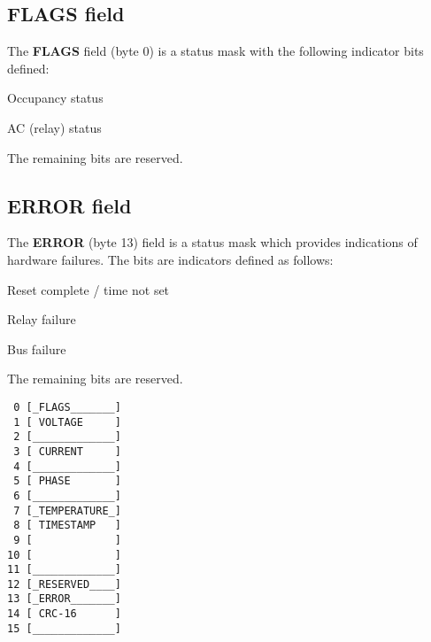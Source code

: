 \documentclass[11pt]{article}
\begin{document}
\vspace{12pt}
\noindent
\begin{minipage}{.5\textwidth}
\subsection{FLAGS field}
The \textbf{FLAGS} field (byte 0) is a status mask with the following indicator bits defined:
\begin{description}
	\itemsep 0pt
	\item[0x01] Occupancy status
	\item[0x02] AC (relay) status 
\end{description}
The remaining bits are reserved.

\subsection{ERROR field}
\label{subsec:errorfield}
The \textbf{ERROR} (byte 13) field is a status mask which provides indications of hardware failures. The bits are indicators defined as follows:
\begin{description}
	\itemsep 0pt
	\item[0x80] Reset complete / time not set
	\item[0x40] Relay failure
	\item[0x20] Bus failure
\end{description}
The remaining bits are reserved. 
\end{minipage}
\hspace{24pt}
\begin{minipage}{.25\textwidth}
\vspace{12pt}
\begin{verbatim}
 0 [_FLAGS_______]
 1 [ VOLTAGE     ]
 2 [_____________]
 3 [ CURRENT     ]
 4 [_____________]
 5 [ PHASE       ]
 6 [_____________]
 7 [_TEMPERATURE_]
 8 [ TIMESTAMP   ]
 9 [             ]
10 [             ]
11 [_____________]
12 [_RESERVED____]
13 [_ERROR_______]
14 [ CRC-16      ]
15 [_____________]
\end{verbatim}
\end{minipage}
\end{document}

